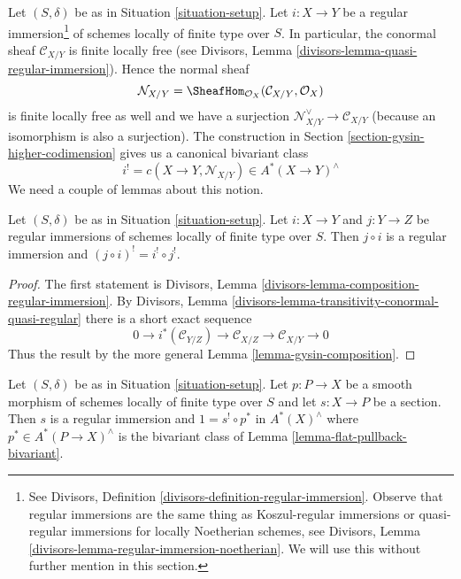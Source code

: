 \medskip\noindent
Let $(S, \delta)$ be as in Situation \ref{situation-setup}.
Let $i : X \to Y$ be a
regular immersion\footnote{See
Divisors, Definition \ref{divisors-definition-regular-immersion}.
Observe that regular immersions are the same thing as
Koszul-regular immersions or quasi-regular immersions
for locally Noetherian schemes, see
Divisors, Lemma \ref{divisors-lemma-regular-immersion-noetherian}.
We will use this without further mention in this section.}
of schemes locally of finite type over $S$.
In particular, the conormal sheaf $\mathcal{C}_{X/Y}$ is finite locally free
(see Divisors, Lemma \ref{divisors-lemma-quasi-regular-immersion}). Hence the
normal sheaf
$$
\mathcal{N}_{X/Y} = \SheafHom_{\mathcal{O}_X}(\mathcal{C}_{X/Y}, \mathcal{O}_X)
$$
is finite locally free as well and we have a surjection
$\mathcal{N}_{X/Y}^\vee \to \mathcal{C}_{X/Y}$ (because an isomorphism
is also a surjection).
The construction in Section \ref{section-gysin-higher-codimension}
gives us a canonical bivariant class
$$
i^! = c(X \to Y, \mathcal{N}_{X/Y}) \in A^*(X \to Y)^\wedge
$$
We need a couple of lemmas about this notion.

\begin{lemma}
\label{lemma-composition-regular-immersion}
Let $(S, \delta)$ be as in Situation \ref{situation-setup}.
Let $i : X \to Y$ and $j : Y \to Z$ be regular immersions
of schemes locally of finite type over $S$. Then
$j \circ i$ is a regular immersion and
$(j \circ i)^! = i^! \circ j^!$.
\end{lemma}

\begin{proof}
The first statement is
Divisors, Lemma \ref{divisors-lemma-composition-regular-immersion}.
By Divisors, Lemma \ref{divisors-lemma-transitivity-conormal-quasi-regular}
there is a short exact sequence
$$
0 \to
i^*(\mathcal{C}_{Y/Z}) \to
\mathcal{C}_{X/Z} \to
\mathcal{C}_{X/Y} \to 0
$$
Thus the result by the more general Lemma \ref{lemma-gysin-composition}.
\end{proof}

\begin{lemma}
\label{lemma-section-smooth}
Let $(S, \delta)$ be as in Situation \ref{situation-setup}.
Let $p : P \to X$ be a smooth morphism of schemes locally of finite type
over $S$ and let $s : X \to P$ be a section. Then $s$ is a
regular immersion and $1 = s^! \circ p^*$ in $A^*(X)^\wedge$
where $p^* \in A^*(P \to X)^\wedge$ is the bivariant class
of Lemma \ref{lemma-flat-pullback-bivariant}.
\end{lemma}


